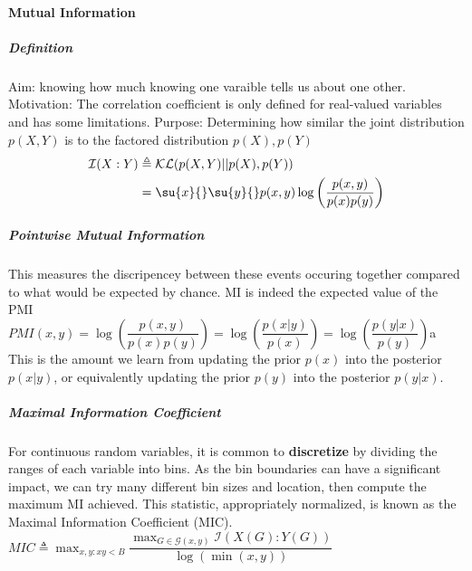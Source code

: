\paragraph{Mutual Information}
\subparagraph{Definition}
Aim: knowing how much knowing one varaible tells us about one other.
Motivation: The correlation coefficient is only defined for real-valued variables and has some limitations. 
Purpose: Determining how similar the joint distribution $p(X, Y)$ is to the factored 
distribution $p(X), p(Y)$
\begin{align*}
    \mathcal{I}(X:Y) &\triangleq \mathcal{KL}(p(X, Y) || p(X), p(Y)) \\
                     &= \su{x}{}\su{y}{}p(x, y)\log\left(\dfrac{p(x,y)}{p(x)p(y)}\right)
\end{align*}
\subparagraph{Pointwise Mutual Information}
This measures the discripencey between these events occuring together compared to what 
would be expected by chance. MI is indeed the expected value of the PMI\\
$PMI(x, y) = \log\left(\dfrac{p(x, y)}{p(x)p(y)}\right) = \log\left(\dfrac{p(x|y)}
{p(x)}\right) = \log\left(\dfrac{p(y|x)} {p(y)}\right)$a\\
This is the amount we learn from updating the prior $p(x)$ into the posterior $p(x|y)$, 
or equivalently updating the prior $p(y)$ into the posterior $p(y|x)$.

\subparagraph{Maximal Information Coefficient}
For continuous random variables, it is common to \textbf{discretize} by dividing the 
ranges of each variable into bins. As the bin boundaries can have a significant impact, we
can try many different bin sizes and location, then compute the maximum MI achieved.
This statistic, appropriately normalized, is known as the Maximal Information Coefficient
(MIC).\\

$MIC \triangleq \displaystyle\max_{x,y:xy<B} \dfrac{\max_{G\in\mathcal{G}(x,y)}\mathcal{I}(X(G):Y(G))}{\log(\min(x,y))}$
